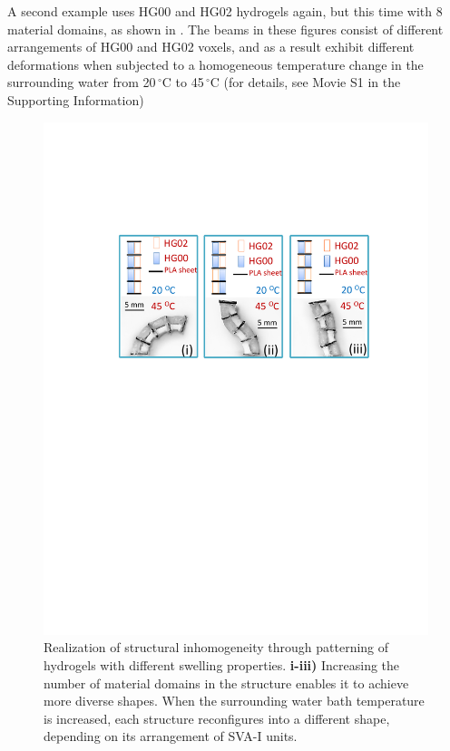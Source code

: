 A second example uses HG00 and HG02 hydrogels again, but this time with 
8 material domains, as shown in . The beams in these figures consist of different arrangements of HG00 and HG02 voxels, and as a result exhibit different deformations when subjected to a homogeneous temperature change in the surrounding water from 20\,$^{\circ}$C to 45\,$^{\circ}$C (for details, see Movie S1 in the Supporting Information)\\
\begin{figure}[!ht]
\centering
\includegraphics[width=\textwidth]{hardcoded.pdf}
\caption[Using SVAs to increase deformation domains]{Realization of structural inhomogeneity through patterning of hydrogels with different swelling properties. \textbf{i-iii)} Increasing the number of material domains in the structure enables it to achieve more diverse shapes. When the surrounding water bath temperature is increased, each structure reconfigures into a different shape, depending on its arrangement of SVA-I units.}
\label{fig:hardcoded}
\end{figure}

